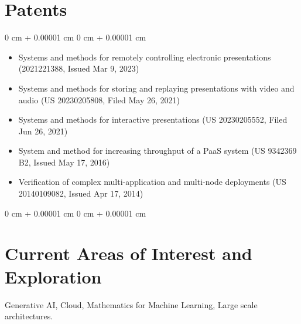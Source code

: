 \documentclass[10pt, letterpaper]{article}
\newenvironment{highlights}{
    \begin{itemize}[
        topsep=0.10 cm,
        parsep=0.10 cm,
        partopsep=0pt,
        itemsep=0pt,
        leftmargin=0 cm + 10pt
    ]
}{
    \end{itemize}
} %
\newenvironment{onecolentry}{
    \begin{adjustwidth}{
        0 cm + 0.00001 cm
    }{
        0 cm + 0.00001 cm
    }
}{
    \end{adjustwidth}
} %
\begin{document}
        \section{Patents}
        \vspace{0.10 cm}
        \begin{onecolentry}
            \begin{highlights}
                \item Systems and methods for remotely controlling electronic presentations (2021221388, Issued Mar 9, 2023)
                \item Systems and methods for storing and replaying presentations with video and audio (US 20230205808, Filed May 26, 2021)
                \item Systems and methods for interactive presentations (US 20230205552, Filed Jun 26, 2021)
                \item System and method for increasing throughput of a PaaS system (US 9342369 B2, Issued May 17, 2016)
                \item Verification of complex multi-application and multi-node deployments (US 20140109082, Issued Apr 17, 2014)
            \end{highlights}
        \end{onecolentry}

        \begin{onecolentry}
        \section{Current Areas of Interest and Exploration}
        \vspace{0.10 cm}
        Generative AI, Cloud, Mathematics for Machine Learning, Large scale architectures.
        \end{onecolentry}
\end{document}
